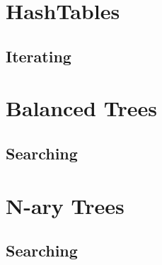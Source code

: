 \section{HashTables}
\subsection{Iterating}

\section{Balanced Trees}
\subsection{Searching}

\section{N-ary Trees}
\subsection{Searching}

